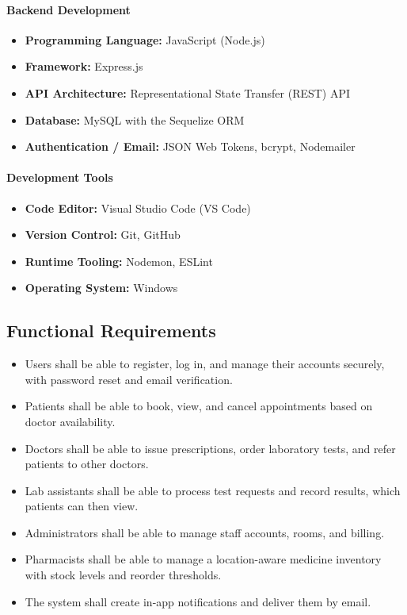 \documentclass[12pt,a4paper]{report}
\begin{document}
\paragraph{Backend Development}
\begin{itemize}[leftmargin=1.4em, itemsep=0pt]
  \item \textbf{Programming Language:} JavaScript (Node.js)
  \item \textbf{Framework:} Express.js
  \item \textbf{API Architecture:} Representational State Transfer (REST) API
  \item \textbf{Database:} MySQL with the Sequelize ORM
  \item \textbf{Authentication / Email:} JSON Web Tokens, bcrypt, Nodemailer
\end{itemize}
\paragraph{Development Tools}
\begin{itemize}[leftmargin=1.4em, itemsep=0pt]
  \item \textbf{Code Editor:} Visual Studio Code (VS Code)
  \item \textbf{Version Control:} Git, GitHub
  \item \textbf{Runtime Tooling:} Nodemon, ESLint
  \item \textbf{Operating System:} Windows
\end{itemize}

\subsection{Functional Requirements}
\begin{itemize}[leftmargin=1.4em]
  \item Users shall be able to register, log in, and manage their accounts securely,
        with password reset and email verification.
  \item Patients shall be able to book, view, and cancel appointments based on doctor
        availability.
  \item Doctors shall be able to issue prescriptions, order laboratory tests, and refer
        patients to other doctors.
  \item Lab assistants shall be able to process test requests and record results, which
        patients can then view.
  \item Administrators shall be able to manage staff accounts, rooms, and billing.
  \item Pharmacists shall be able to manage a location-aware medicine inventory with
        stock levels and reorder thresholds.
  \item The system shall create in-app notifications and deliver them by email.
\end{itemize}
\end{document}
